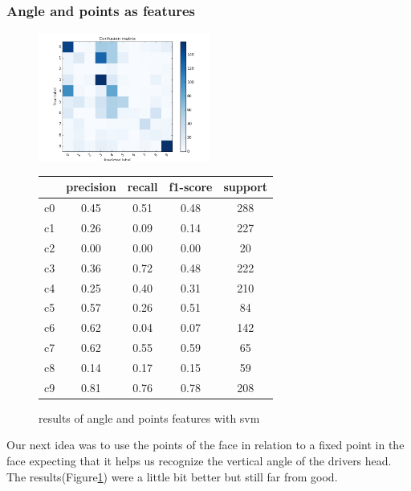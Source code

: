 \documentclass[10pt,twocolumn,letterpaper]{article}
\begin{document}
\subsubsection{Angle and points as features}
\begin{figure}[h]
	\centering
	\includegraphics[width=0.5\textwidth]{all_vs_all_headpose}\hspace{0.01\textwidth}
	\begin{tabular}{c||c|c|c|c}
	  & precision&recall&f1-score&support\\	\hline
	 c0&0.45&0.51&0.48&288\\
	 c1&0.26&0.09&0.14&227\\
	 c2&0.00&0.00&0.00&20\\
	 c3&0.36&0.72&0.48&222\\
	 c4&0.25&0.40&0.31&210\\
	 c5&0.57&0.26&0.51&84\\
	 c6&0.62&0.04&0.07&142\\
	 c7&0.62&0.55&0.59&65\\
	 c8&0.14&0.17&0.15&59\\
	 c9&0.81&0.76&0.78&208
	\end{tabular}
	\caption{results of angle and points features with svm}
	\label{headposeandpoints_feature}
	\end{figure}

Our next idea was to use the points of the face in relation to a fixed point in the face expecting that it helps us recognize the vertical angle of the drivers head. The results(Figure\ref{headposeandpoints_feature}) were a little bit better but still far from good.
\end{document}
